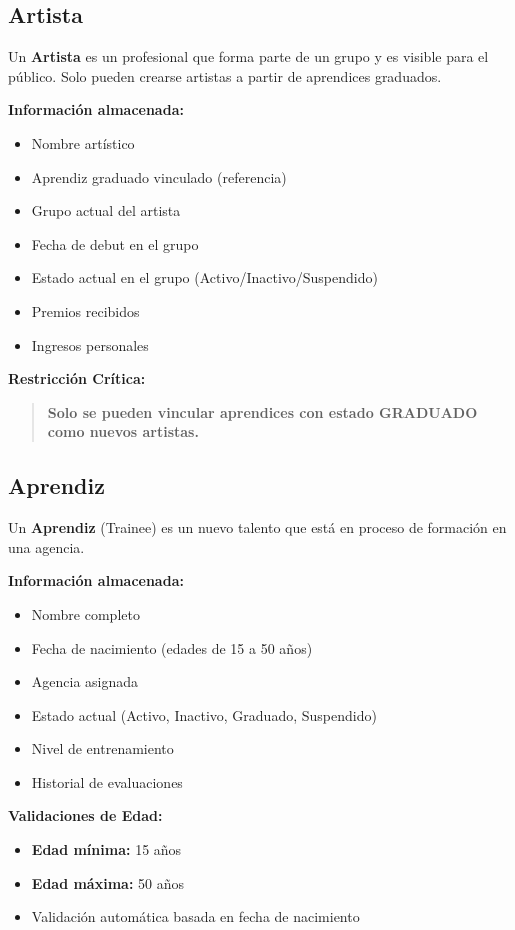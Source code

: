 \documentclass[12pt,a4paper,spanish,oneside]{report}
\begin{document}
\subsection{Artista}

Un \textbf{Artista} es un profesional que forma parte de un grupo y es visible para el público. Solo pueden crearse artistas a partir de aprendices graduados.

\textbf{Información almacenada:}
\begin{itemize}
\item Nombre artístico
\item Aprendiz graduado vinculado (referencia)
\item Grupo actual del artista
\item Fecha de debut en el grupo
\item Estado actual en el grupo (Activo/Inactivo/Suspendido)
\item Premios recibidos
\item Ingresos personales
\end{itemize}

\textbf{Restricción Crítica:}
\begin{quote}
\textbf{Solo se pueden vincular aprendices con estado GRADUADO como nuevos artistas.}
\end{quote}

\subsection{Aprendiz}

Un \textbf{Aprendiz} (Trainee) es un nuevo talento que está en proceso de formación en una agencia.

\textbf{Información almacenada:}
\begin{itemize}
\item Nombre completo
\item Fecha de nacimiento (edades de 15 a 50 años)
\item Agencia asignada
\item Estado actual (Activo, Inactivo, Graduado, Suspendido)
\item Nivel de entrenamiento
\item Historial de evaluaciones
\end{itemize}

\textbf{Validaciones de Edad:}
\begin{itemize}
\item \textbf{Edad mínima:} 15 años
\item \textbf{Edad máxima:} 50 años
\item Validación automática basada en fecha de nacimiento
\end{itemize}
\end{document}
